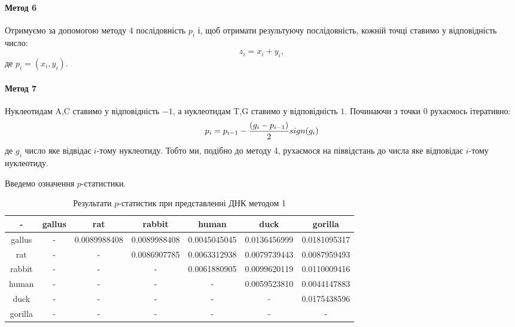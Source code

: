 \documentclass[14pt]{extarticle}
\begin{document}
\paragraph{Метод 6}
Отримуємо за допомогою методу 4 послідовність $p_i$ і, щоб отримати результуючу послідовність, кожній точці ставимо у відповідність число:
\[z_i = x_i + y_i,\]
де $p_i = (x_i,y_i)$.
\paragraph{Метод 7}
Нуклеотидам A,C ставимо у відповідність $-1$, а нуклеотидам T,G ставимо у відповідність $1$. Починаючи з точки $0$ рухаємось ітеративно:
\[p_i = p_{i-1} - {(g_i-p_{i-1}) \over{2}}sign(g_i)\]
де $g_i$ число яке відвідає $i$-тому нуклеотиду. Тобто ми, подібно до методу 4, рухаємося на піввідстань до числа яке відповідає $i$-тому нуклеотиду.

\par
Введемо означення $p$-статистики.

\newpage
\begin{table}[h!]
\begin{center}
\begin{tabular}{|c|c|c|c|c|c|c|}
\hline
- & gallus & rat & rabbit & human & duck & gorilla \\ \hline
gallus & - & 0.0089988408 & 0.0089988408 & 0.0045045045 & 0.0136456999 & 0.0181095317 \\ \hline
rat & - & - & 0.0086907785 & 0.0063312938 & 0.0079739443 & 0.0087959493 \\ \hline
rabbit & - & - & - & 0.0061880905 & 0.0099620119 & 0.0110009416 \\ \hline
human & - & - & - & - & 0.0059523810 & 0.0044147883 \\ \hline
duck & - & - & - & - & - & 0.0175438596 \\ \hline
gorilla & - & - & - & - & - & - \\ \hline
\end{tabular}
\end{center}
\caption{Результати $p$-статистик при представленні ДНК методом 1}
\label{table:res1}
\end{table}
\end{document}
